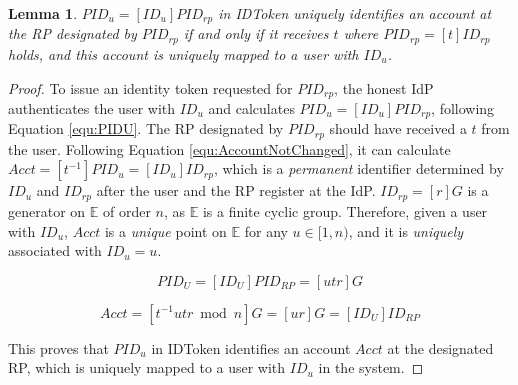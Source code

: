 \documentclass[letterpaper,onecolumn,10pt]{article}
\newtheorem{lemma}{Lemma}
\begin{document}
\begin{lemma}\label{user-identification}
  $PID_u= [ID_u]PID_{rp}$ in IDToken uniquely identifies an 
  account at the RP designated by $PID_{rp}$ if and only if 
  it receives $t$ where $PID_{rp} = [t]ID_{rp}$ holds, and 
  this account is uniquely mapped to a user with $ID_u$.
\end{lemma}
\begin{proof}
  To issue an identity token requested for $PID_{rp}$, the 
  honest IdP authenticates the user with $ID_u$ and calculates 
  $PID_u = [ID_u]PID_{rp}$, following Equation \ref{equ:PIDU}. 
  The RP designated by $PID_{rp}$ should have received a $t$ 
  from the user. Following Equation \ref{equ:AccountNotChanged}, 
  it can calculate $Acct = [t^{-1}]PID_{u} = [ID_u]ID_{rp}$, 
  which is a \emph{permanent} identifier determined by $ID_u$ 
  and $ID_{rp}$ after the user and the RP register at the IdP. 
  $ID_{rp} = [r]G$ is a generator on $\mathbb{E}$ of order $n$, 
  as $\mathbb{E}$ is a finite cyclic group. Therefore, given a 
  user with $ID_u$, $Acct$ is a \emph{unique} point on 
  $\mathbb{E}$ for any $u \in [1, n)$, and it is \emph{uniquely} 
  associated with $ID_u=u$. 
  
  \begin{equation}
    PID_{U} = [{ID_U}]{PID_{RP}} = [utr]G
     \label{equ:PIDU}
  \end{equation}

  \begin{equation}
    Acct =  [t^{-1}utr \bmod n]G = [ur]G = [ID_U]ID_{RP}
    \label{equ:AccountNotChanged}
  \end{equation}

  This proves that $PID_u$ in IDToken identifies an account 
  $Acct$ at the designated RP, which is uniquely mapped to a 
  user with $ID_u$ in the system.


\end{proof}
\end{document}
